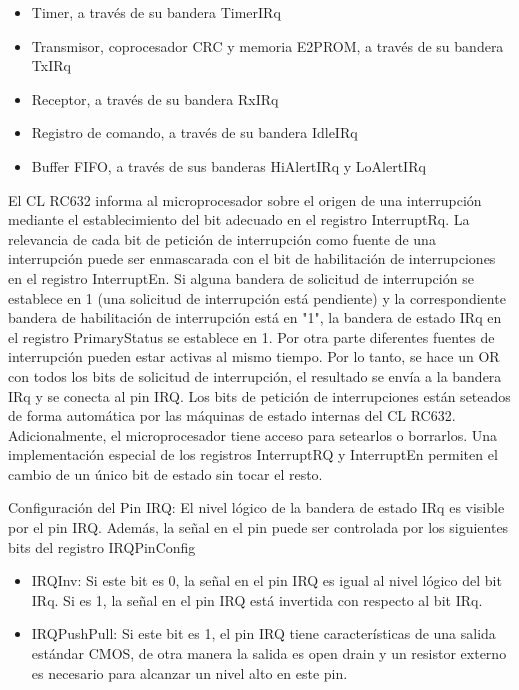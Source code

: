 \begin{itemize}

\item Timer, a través de su bandera TimerIRq 
\item Transmisor, coprocesador CRC y memoria E2PROM, a través de su bandera TxIRq 
\item Receptor, a través de su bandera RxIRq 
\item Registro de comando, a través de su bandera IdleIRq 
\item Buffer FIFO, a través de sus banderas HiAlertIRq y LoAlertIRq 

\end{itemize}

El CL RC632 informa al microprocesador sobre el origen de una interrupción mediante el establecimiento del bit adecuado en el registro InterruptRq. La relevancia de cada bit de petición de interrupción como fuente de una interrupción puede ser enmascarada con el bit de habilitación de interrupciones en el registro InterruptEn. 
Si alguna bandera de solicitud de interrupción se establece en 1 (una solicitud de interrupción está pendiente) y la correspondiente bandera de habilitación de interrupción está en "1", la bandera de estado IRq en el registro PrimaryStatus se establece en 1. 
Por otra parte diferentes fuentes de interrupción pueden estar activas al mismo tiempo. Por lo tanto, se hace un OR con todos los bits de solicitud de interrupción, el resultado se envía a la bandera IRq y se conecta al pin IRQ. 
Los bits de petición de interrupciones están seteados de forma automática por las máquinas de estado internas del CL RC632. Adicionalmente, el microprocesador tiene acceso para setearlos o borrarlos. 
Una implementación especial de los registros InterruptRQ y InterruptEn permiten el cambio de un único bit de estado sin tocar el resto. 

Configuración del Pin IRQ:
El nivel lógico de la bandera de estado IRq es visible por el pin IRQ. Además, la señal en el pin puede ser controlada por los siguientes bits del registro IRQPinConfig 
\begin{itemize}
\item IRQInv: Si este bit es 0, la señal en el pin IRQ es igual al nivel lógico del bit IRq. 
Si es 1, la señal en el pin IRQ está invertida con respecto al bit IRq. 
\item IRQPushPull:  Si este bit es 1, el pin IRQ tiene características de una salida estándar 				   CMOS, de otra manera la salida es open drain y un resistor externo es 				   necesario para alcanzar un nivel alto en este pin. 
\end{itemize}


